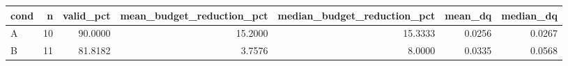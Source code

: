 \begin{tabular}{lrrrrrr}
\toprule
cond &  n &  valid\_pct &  mean\_budget\_reduction\_pct &  median\_budget\_reduction\_pct &  mean\_dq &  median\_dq \\
\midrule
   A & 10 &    90.0000 &                    15.2000 &                      15.3333 &   0.0256 &     0.0267 \\
   B & 11 &    81.8182 &                     3.7576 &                       8.0000 &   0.0335 &     0.0568 \\
\bottomrule
\end{tabular}
